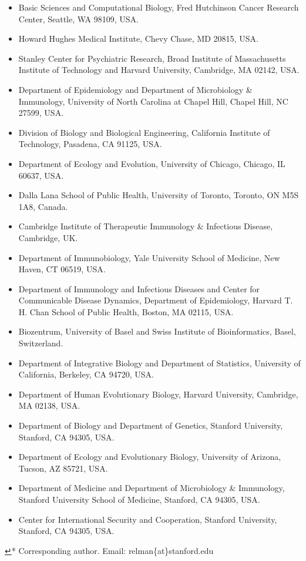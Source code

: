 \documentclass[11pt]{article}
\begin{document}
\begin{itemize}
\item Basic Sciences and Computational Biology, Fred Hutchinson Cancer Research Center, Seattle, WA 98109, USA.
\item Howard Hughes Medical Institute, Chevy Chase, MD 20815, USA.
\item Stanley Center for Psychiatric Research, Broad Institute of Massachusetts Institute of Technology and Harvard University, Cambridge, MA 02142, USA.
\item Department of Epidemiology and Department of Microbiology \& Immunology, University of North Carolina at Chapel Hill, Chapel Hill, NC 27599, USA.
\item Division of Biology and Biological Engineering, California Institute of Technology, Pasadena, CA 91125, USA.
\item Department of Ecology and Evolution, University of Chicago, Chicago, IL 60637, USA.
\item Dalla Lana School of Public Health, University of Toronto, Toronto, ON M5S 1A8, Canada.
\item Cambridge Institute of Therapeutic Immunology \& Infectious Disease, Cambridge, UK.
\item Department of Immunobiology, Yale University School of Medicine, New Haven, CT 06519, USA.
\item Department of Immunology and Infectious Diseases and Center for Communicable Disease Dynamics, Department of Epidemiology, Harvard T. H. Chan School of Public Health, Boston, MA 02115, USA.
\item Biozentrum, University of Basel and Swiss Institute of Bioinformatics, Basel, Switzerland.
\item Department of Integrative Biology and Department of Statistics, University of California, Berkeley, CA 94720, USA.
\item Department of Human Evolutionary Biology, Harvard University, Cambridge, MA 02138, USA.
\item Department of Biology and Department of Genetics, Stanford University, Stanford, CA 94305, USA.
\item Department of Ecology and Evolutionary Biology, University of Arizona, Tucson, AZ 85721, USA.
\item Department of Medicine and Department of Microbiology \& Immunology, Stanford University School of Medicine, Stanford, CA 94305, USA.
\item Center for International Security and Cooperation, Stanford University, Stanford, CA 94305, USA.
\end{itemize}
\hyperref[relman]{↵}* Corresponding author. Email: relman\{at\}stanford.edu
\end{document}
